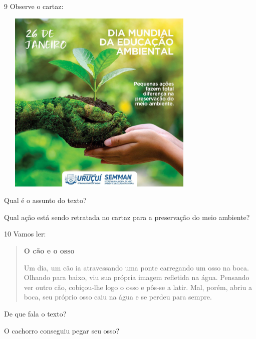 \num{9} Observe o cartaz:

\includegraphics[width=3.96154in,height=3.50028in]{media/image123.jpeg}


\begin{escolha}
\item Qual é o assunto do texto?


\item Qual ação está sendo retratada no cartaz para a preservação do meio ambiente?

\end{escolha}

\num{10} Vamos ler:

\begin{quote}
\textbf{O cão e o osso}

Um dia, um cão ia atravessando uma ponte carregando um osso na boca.
Olhando para baixo, viu sua própria imagem refletida
na água. Pensando ver outro cão, cobiçou-lhe logo o osso e
pôs-se a latir. Mal, porém, abriu a boca, seu próprio osso caiu
na água e se perdeu para sempre.
\end{quote}


\begin{escolha}
\item De que fala o texto?


\item O cachorro conseguiu pegar seu osso?

\end{escolha}

